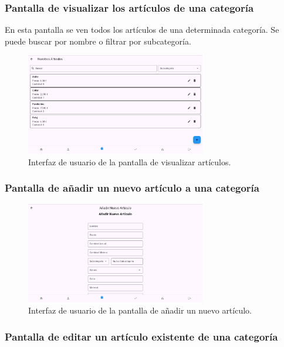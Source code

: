 \subsubsection{Pantalla de visualizar los artículos de una categoría}

En esta pantalla se ven todos los artículos de una determinada categoría. Se puede buscar por nombre o filtrar por subcategoría. 

\begin{figure}[H]
	\centering
	\includegraphics[width=0.7\textwidth]{imagenes/PrimeraIteracion/visualizarArticulos.png}
	\caption{Interfaz de usuario de la pantalla de visualizar artículos.}
	\label{fig:appVisualizarArticulos}
\end{figure}

\subsubsection{Pantalla de añadir un nuevo artículo a una categoría}

\begin{figure}[H]
	\centering
	\includegraphics[width=0.7\textwidth]{imagenes/PrimeraIteracion/nuevoArticulo.png}
	\caption{Interfaz de usuario de la pantalla de añadir un nuevo artículo.}
	\label{fig:appNuevoArticulo}
\end{figure}

\subsubsection{Pantalla de editar un artículo existente de una categoría}

